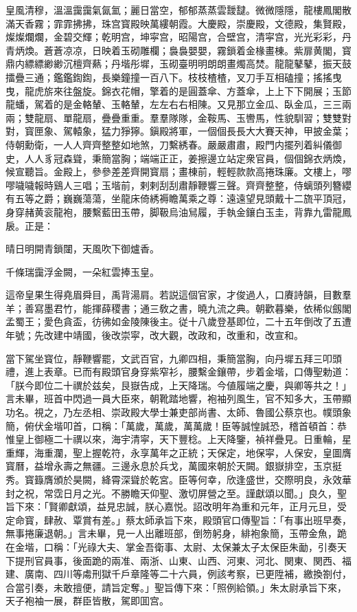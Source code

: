 \begin{myquote}
皇風清穆，溫溫靄靄氣氤氳；麗日當空，郁郁蒸蒸雲靉靆。微微隱隱，龍樓鳳閣散滿天香霧；霏霏拂拂，珠宫寳殿映萬縷朝霞。大慶殿，崇慶殿，文德殿，集賢殿，燦燦爛爛，金碧交輝；乾明宫，坤寜宫，昭陽宫，合壁宫，清寜宫，光光彩彩，丹青炳煥。蒼蒼凉凉，日映着玉砌雕欄；裊裊嬰嬰，霧鎖着金椽畫棟。紫扉黄閣，寳鼎内縹縹緲緲沉檀齊爇；丹堦彤墀，玉砌臺明明朗朗畫燭高焚。龍龍鼕鼕，振天鼓擂疊三通；鑑鑑鍧鍧，長樂鐘撞一百八下。枝枝楂楂，叉刀手互相磕撞；搖搖曳曳，龍虎旂來往盤旋。錦衣花帽，擎着的是圓蓋傘、方蓋傘，上上下下開展；玉節龍蟠，駕着的是金輅輦、玉輅輦，左左右右相陳。又見那立金瓜、臥金瓜，三三兩兩；雙龍扇、單龍扇，疊疊重重。羣羣隊隊，金鞍馬、玉轡馬，性貌馴習；雙雙對對，寳匣象、駕轅象，猛力猙獰。鎭殿將軍，一個個長長大大賽天神，甲披金葉；侍朝勳衛，一人人齊齊整整如地煞，刀繫綉春。嚴嚴肅肅，殿門内擺列着糾儀御史，人人豸冠森聳，秉簡當胸；端端正正，姜擦邊立站定衆官員，個個錦衣炳煥，候宣聽旨。金殿上，參參差差齊開寳扇；畫棟前，輕輕款款高捲珠廉。文樓上，嘐嘐噦噦報時鷄人三唱；玉堦前，剌剌刮刮肅靜鞭響三聲。齊齊整整，侍螭頭列簪纓有五等之爵；巍巍蕩蕩，坐龍床倚綉褥瞻萬乘之尊：遠遠望見頭戴十二旒平頂冠，身穿赭黄衮龍袍，腰繫藍田玉帶，脚靸烏油舃履，手執金鑲白玉圭，背靠九雷龍鳳扆。正是：

晴日明開青鎖闥，天風吹下御爐香。

千條瑞靄浮金闕，一朵紅雲捧玉皇。
\end{myquote}

這帝皇果生得堯眉舜目，禹背湯肩。若説這個官家，才俊過人，口賡詩韻，目數羣羊；善寫墨君竹，能揮薛稷書；通三敎之書，曉九流之典。朝歡暮樂，依稀似劔閣孟蜀王；愛色貪盃，彷彿如金陵陳後主。従十八歲登基即位，二十五年倒改了五遭年號；先改建中靖國，後改崇寜，改大觀，改政和，改重和，改宣和。

當下駕坐寳位，靜鞭響罷，文武百官，九卿四相，秉簡當胸，向丹墀五拜三叩頭禮，進上表章。已而有殿頭官身穿紫窄衫，腰繫金鑲帶，步着金堦，口傳聖勅道：「朕今即位二十禩於兹矣，艮嶽告成，上天降瑞。今値履端之慶，與卿等共之！」言未畢，班首中閃過一員大臣來，朝靴踏地響，袍袖列風生，官不知多大，玉帶顯功名。視之，乃左丞相、崇政殿大學士兼吏部尚書、太師、魯國公蔡京也。幞頭象簡，俯伏金堦叩首，口稱：「萬歲，萬歲，萬萬歲！臣等誠惶誠恐，稽首頓首：恭惟皇上御極二十禩以來，海宇清寜，天下豐稔。上天降鑒，禎祥疊見。日重輪，星重輝，海重瀾，聖上握乾符，永享萬年之正統；天保定，地保寜，人保安，皇圖膺寳曆，益增永壽之無疆。三邊永息於兵戈，萬國來朝於天闕。銀嶽排空，玉京挺秀。寳籙膺頒於昊闕，絳霄深聳於乾宮。臣等何幸，欣逢盛世，交際明良，永效華封之祝，常霑日月之光。不勝瞻天仰聖、激切屏營之至。謹獻頌以聞。」良久，聖旨下來：「賢卿獻頌，益見忠誠，朕心嘉悦。詔改明年為重和元年，正月元旦，受定命寳，肆赦、覃賞有差。」蔡太師承旨下來，殿頭官口傳聖旨：「有事出班早奏，無事捲廉退朝。」言未畢，見一人出離班部，倒笏躬身，緋袍象簡，玉帶金魚，跪在金堦，口稱：「光祿大夫、掌金吾衛事、太尉、太保兼太子太保臣朱勔，引奏天下提刑官員事，後面跪的兩准、兩浙、山東、山西、河東、河北、関東、関西、福建、廣南、四川等䖏刑獄千戶章隆等二十六員，例該考察，已更陞補，繳換劄付，合當引奏，未敢擅便，請旨定奪。」聖旨傳下來：「照例給領。」朱太尉承旨下來，天子袍袖一展，群臣皆散，駕即囬宫。

